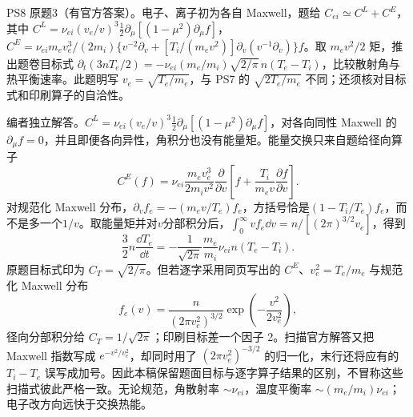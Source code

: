 \begin{exercise}\label{ex:hist02-8-3}
PS8 原题3（有官方答案）。电子、离子初为各自 Maxwell，题给 $C_{ei}\simeq C^L+C^E$，其中 $C^L=\nu_{ei}(v_e/v)^3\frac12\partial_\mu[(1-\mu^2)\partial_\mu f]$，$C^E=\nu_{ei}m_ev_e^3/(2m_i)\{v^{-2}\partial_v+[T_i/(m_ev^2)]\partial_v(v^{-1}\partial_v)\}f$。取 $m_ev^2/2$ 矩，推出题卷目标式 $\partial_t(3nT_e/2)=-\nu_{ei}(m_e/m_i)\sqrt{2/\pi}\,n(T_e-T_i)$，比较散射角与热平衡速率。此题明写 $v_e=\sqrt{T_e/m_e}$，与 PS7 的 $\sqrt{2T_e/m_e}$ 不同；还须核对目标式和印刷算子的自洽性。
\end{exercise}
\begin{solution}
编者独立解答。$C^L=\nu_{ei}(v_e/v)^3\frac12\partial_\mu[(1-\mu^2)\partial_\mu f]$，对各向同性 Maxwell 的 $\partial_\mu f=0$，并且即便各向异性，角积分也没有能量矩。能量交换只来自题给径向算子\begin{equation}C^E(f)=\nu_{ei}\frac{m_e v_e^3}{2m_i v^2}\frac{\partial}{\partial v}\left[f+\frac{T_i}{m_ev}\frac{\partial f}{\partial v}\right].\end{equation}对规范化 Maxwell 分布，$\partial_vf_e=-(m_ev/T_e)f_e$，方括号恰是$(1-T_i/T_e)f_e$，而不是多一个$1/v$。取能量矩并对$v$分部积分后，$\int_0^\infty vf_e\dd v=n/[(2\pi)^{3/2}v_e]$，得到
\begin{equation}\frac32n\frac{\dd T_e}{\dd t}=-\frac1{\sqrt{2\pi}}\frac{m_e}{m_i}\nu_{ei}n(T_e-T_i).
\end{equation}
原题目标式印为 $C_T=\sqrt{2/\pi}$。但若逐字采用同页写出的 $C^E$、$v_e^2=T_e/m_e$ 与规范化 Maxwell 分布\begin{equation}f_e(v)=\frac{n}{(2\pi v_e^2)^{3/2}}\exp\!\left(-\frac{v^2}{2v_e^2}\right),\end{equation}径向分部积分给 $C_T=1/\sqrt{2\pi}$；印刷目标差一个因子 2。扫描官方解答又把 Maxwell 指数写成 $e^{-v^2/v_e^2}$，却同时用了 $(2\pi v_e^2)^{-3/2}$ 的归一化，末行还将应有的 $T_i-T_e$ 误写成加号。因此本稿保留题面目标与逐字算子结果的区别，不冒称这些扫描式彼此严格一致。无论规范，角散射率 $\sim\nu_{ei}$，温度平衡率 $\sim(m_e/m_i)\nu_{ei}$；电子改方向远快于交换热能。
\end{solution}
